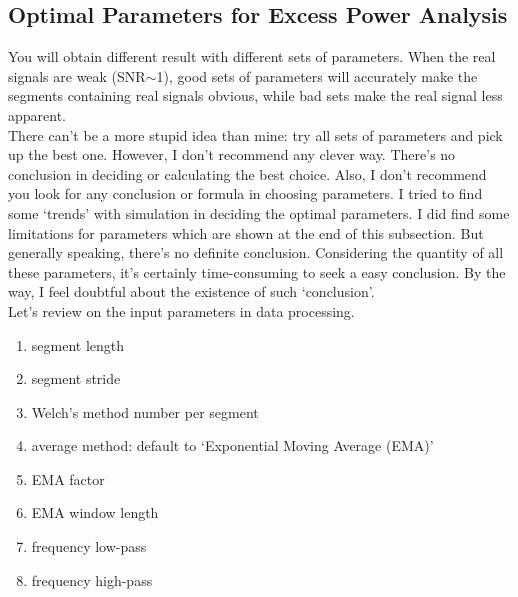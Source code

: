 \documentclass[
12pt, %
a4paper %
]{extreport}
\theoremstyle{plain}
\begin{document}

%

\subsection{Optimal Parameters for Excess Power Analysis}
You will obtain different result with different sets of parameters. When the real signals are weak (SNR$\sim$1), good sets of parameters will accurately make the segments containing real signals obvious, while bad sets make the real signal less apparent. \\
There can’t be a more stupid idea than mine: try all sets of parameters and pick up the best one. However, I don’t recommend any clever way. There’s no conclusion in deciding or calculating the best choice. Also, I don’t recommend you look for any conclusion or formula in choosing parameters. I tried to find some ‘trends’ with simulation in deciding the optimal parameters. I did find some limitations for parameters which are shown at the end of this subsection. But generally speaking, there’s no definite conclusion. Considering the quantity of all these parameters, it’s certainly time-consuming to seek a easy conclusion. By the way, I feel doubtful about the existence of such ‘conclusion’. \\
Let’s review on the input parameters in data processing.
\begin{enumerate}
\item[] segment length
\item[] segment stride
\item[] Welch’s method number per segment
\item[] average method: default to ‘Exponential Moving Average (EMA)’
\item[] EMA factor
\item[] EMA window length
\item[] frequency low-pass
\item[] frequency high-pass
\end{enumerate}
\end{document}
